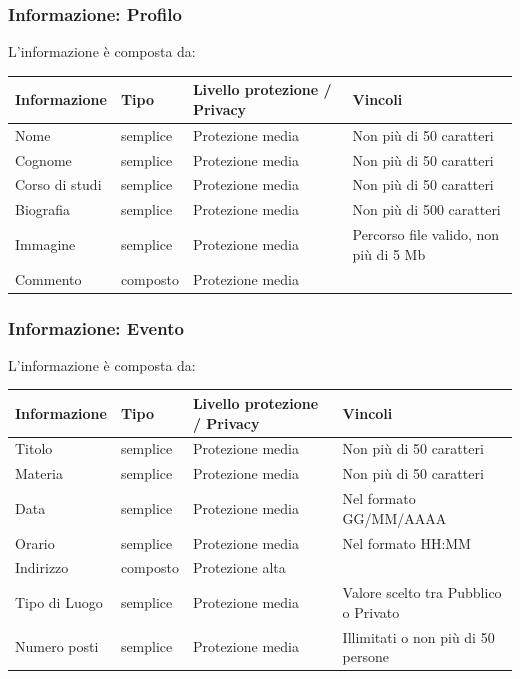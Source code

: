 \documentclass[12pt,a4paper]{report}
\let\oldhyperref\hyperref
\renewcommand{\hyperref}[2][]{\oldhyperref[#1]{\dotuline{#2}}}
\begin{document}
\subsubsection{Informazione: Profilo} \label{Profilo}
L'informazione \hyperref[Profilo]{Profilo} è composta da:
\begin{tabularx}{\textwidth}{|p{2.8cm}|p{1.8cm}|p{3.2cm}|X|}
    \hline
    \rowcolor{studyColor} \textbf{Informazione} & \textbf{Tipo} & \textbf{Livello protezione / Privacy} & \textbf{Vincoli} \\ \hline
    \endhead
    Nome & semplice & Protezione media & Non più di 50 caratteri \\ \hline
    Cognome & semplice & Protezione media & Non più di 50 caratteri \\ \hline
    Corso di studi & semplice & Protezione media & Non più di 50 caratteri \\ \hline
    Biografia & semplice & Protezione media & Non più di 500 caratteri \\ \hline
    Immagine & semplice & Protezione media & Percorso file valido, non più di 5 Mb \\ \hline
    Commento & composto & Protezione media & \\ \hline
\end{tabularx}

\subsubsection{Informazione: Evento} \label{Evento}
L'informazione \hyperref[Evento]{Evento} è composta da:
\begin{tabularx}{\textwidth}{|p{2.8cm}|p{1.8cm}|p{3.2cm}|X|}
    \hline
    \rowcolor{studyColor} \textbf{Informazione} & \textbf{Tipo} & \textbf{Livello protezione / Privacy} & \textbf{Vincoli} \\ \hline
    \endhead
    Titolo & semplice & Protezione media & Non più di 50 caratteri \\ \hline
    Materia & semplice & Protezione media & Non più di 50 caratteri \\ \hline
    Data & semplice & Protezione media & Nel formato GG/MM/AAAA \\ \hline
    Orario & semplice & Protezione media & Nel formato HH:MM \\ \hline
    Indirizzo & composto & Protezione alta & \\ \hline
    Tipo di Luogo & semplice & Protezione media & Valore scelto tra Pubblico o Privato \\ \hline
    Numero posti & semplice & Protezione media & Illimitati o non più di 50 persone \\ \hline
\end{tabularx}
\end{document}
